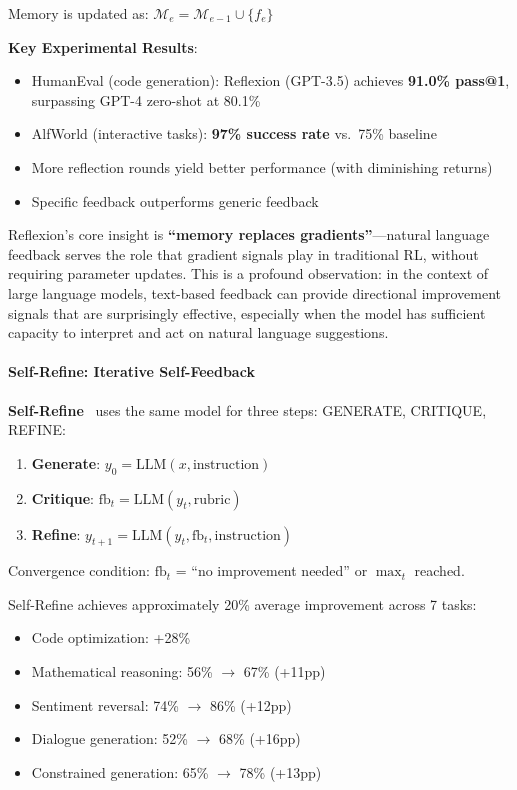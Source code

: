 Memory is updated as: $\mathcal{M}_e = \mathcal{M}_{e-1} \cup \{f_e\}$

\textbf{Key Experimental Results}:
\begin{itemize}
\item HumanEval (code generation): Reflexion (GPT-3.5) achieves \textbf{91.0\% pass@1}, surpassing GPT-4 zero-shot at 80.1\%
\item AlfWorld (interactive tasks): \textbf{97\% success rate} vs.\ 75\% baseline
\item More reflection rounds yield better performance (with diminishing returns)
\item Specific feedback outperforms generic feedback
\end{itemize}

Reflexion's core insight is \textbf{``memory replaces gradients''}---natural language feedback serves the role that gradient signals play in traditional RL, without requiring parameter updates. This is a profound observation: in the context of large language models, text-based feedback can provide directional improvement signals that are surprisingly effective, especially when the model has sufficient capacity to interpret and act on natural language suggestions.

\paragraph{Self-Refine: Iterative Self-Feedback}

\textbf{Self-Refine}~\citep{selfrefine2023} uses the same model for three steps: GENERATE, CRITIQUE, REFINE:

\begin{enumerate}
\item \textbf{Generate}: $y_0 = \text{LLM}(x, \text{instruction})$
\item \textbf{Critique}: $\text{fb}_t = \text{LLM}(y_t, \text{rubric})$
\item \textbf{Refine}: $y_{t+1} = \text{LLM}(y_t, \text{fb}_t, \text{instruction})$
\end{enumerate}

Convergence condition: $\text{fb}_t$ = ``no improvement needed'' or $\max_t$ reached.

Self-Refine achieves approximately 20\% average improvement across 7 tasks:
\begin{itemize}
\item Code optimization: +28\%
\item Mathematical reasoning: 56\% $\rightarrow$ 67\% (+11pp)
\item Sentiment reversal: 74\% $\rightarrow$ 86\% (+12pp)
\item Dialogue generation: 52\% $\rightarrow$ 68\% (+16pp)
\item Constrained generation: 65\% $\rightarrow$ 78\% (+13pp)
\end{itemize}

